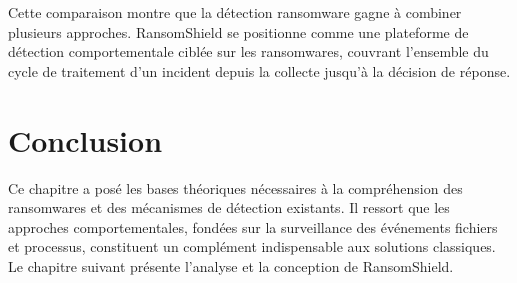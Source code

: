 \noindent Cette comparaison montre que la détection ransomware gagne à combiner plusieurs approches. RansomShield se positionne comme une plateforme de détection comportementale ciblée sur les ransomwares, couvrant l'ensemble du cycle de traitement d'un incident depuis la collecte jusqu'à la décision de réponse.


{}
\section*{Conclusion}

Ce chapitre a posé les bases théoriques nécessaires à la compréhension des ransomwares et des mécanismes de détection existants. Il ressort que les approches comportementales, fondées sur la surveillance des événements fichiers et processus, constituent un complément indispensable aux solutions classiques. Le chapitre suivant présente l'analyse et la conception de RansomShield.